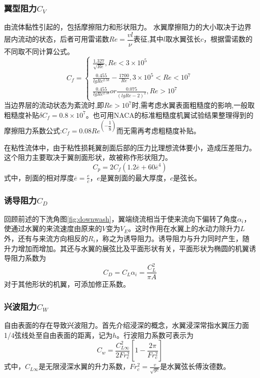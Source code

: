 \documentclass[10.5pt,twocolumn]{jbuaa}
\begin{document}
\subsubsection{翼型阻力$C_V$}
由流体黏性引起的，包括摩擦阻力和形状阻力。
水翼摩擦阻力的大小取决于边界层内流动的状态，后者可用雷诺数$Re = \dfrac{vl}{\nu}$表征,其中$l$取水翼弦长$c$，根据雷诺数的不同取不同计算公式。
\begin{equation}
{C_f} = \begin{cases}
\frac{{1.327}}{{\sqrt {Re} }},                                           Re < 3 \times 1{0^5}\\
\frac{{0.455}}{{lgR{e^{2.58}}}} - \frac{{1700}}{{Re}} , 3\times 1{0^5} < Re < 1{0^7}\\
\frac{{0.455}}{{lgR{e^{2.58}}}}or\frac{{0.075}}{{{{(lgRe - 2)}^2}}},     Re > 1{0^7}
\end{cases}
\end{equation}
当边界层的流动状态为紊流时,即$Re>1{0^7}$时,需考虑水翼表面粗糙度的影响,一般取粗糙度补贴$\delta C_f = 0.8 \times 1{0^7} $。也可用NACA的标准粗糙度机翼试验结果整理得到的摩擦阻力系数公式:$ C_f = 0.08Re^(-\dfrac{1}{8})$而无需再考虑粗糙度补贴。

在粘性流体中，由于粘性损耗翼剖面后部的压力比理想流体要小，造成压差阻力。这个阻力主要取决于翼剖面形状，故被称作形状阻力。
\begin{equation}
C_p = 2C_f(1.2\overline{e} + 60\overline{e}^4)
\end{equation}
式中，剖面的相对厚度$\overline{e}=\frac{e}{c}$，$e$是翼剖面的最大厚度，$c$是弦长。

\subsubsection{诱导阻力$C_D$}
回顾前述的下洗角图\ref{fig:downwash}，翼端绕流相当于使来流向下偏转了角度$\alpha_i$，使通过水翼的来流速度由原来的$V$变为$V_E$。这时作用在水翼上的水动力除升力$L$外，还有与来流方向相反的$R_i$，称之为诱导阻力。诱导阻力与升力同时产生，随升力增加而增加。其还与水翼的展弦比及平面形状有关，平面形状为椭圆的机翼诱导阻力系数为
\begin{equation}
C_D = C_L\alpha_i=\frac{C_L^2}{\pi A}
\end{equation}
对于其他形状的机翼，可添加修正系数。

\subsubsection{兴波阻力$C_W$}
自由表面的存在导致兴波阻力。首先介绍浸深的概念，水翼浸深常指水翼压力面1/4弦线处至自由表面的距离，记为$h$。行波阻力系数可表示为
\begin{equation}
C_w = \frac{C_{L\infty}^2}{2Fr_c^2}[1-\frac{2\pi}{Fr_c^2}]
\end{equation}
式中，$C_{L\infty}$是无限浸深水翼的升力系数，$Fr_c^2=\frac{v}{\sqrt{gc}}$是水翼弦长傅汝德数。
\end{document}
